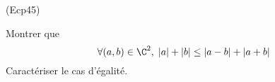 \begin{tiny}(Ecp45)\end{tiny} Montrer que
\[
 \forall(a,b)\in \C^2, \; |a|+|b| \leq |a-b| + |a+b|
\]
Caractériser le cas d'égalité.